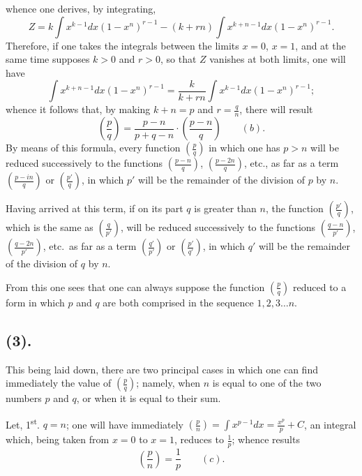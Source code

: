 \documentclass{article}
\begin{document}
whence one derives, by integrating,
\[ Z=k\int x^{k-1}dx(1-x^{n})^{r-1}-(k+rn)\int x^{k+n-1}dx(1-x^{n})^{r-1}. \]
Therefore, if one takes the integrals between the limits $x=0$, $x=1$, and at the same time supposes $k>0$ and $r>0$, so that $Z$ vanishes at both limits, one will have
\[ \int x^{k+n-1}dx(1-x^{n})^{r-1}=\frac{k}{k+rn}\int x^{k-1}dx(1-x^{n})^{r-1}; \]
whence it follows that, by making $k+n=p$ and $r=\frac{q}{n}$, there will result
\[ \left(\frac{p}{q}\right)=\frac{p-n}{p+q-n}\cdot\left(\frac{p-n}{q}\right)\qquad(b). \]
By means of this formula, every function $\left(\frac{p}{q}\right)$ in which one has $p>n$ will be reduced successively to the functions $\left(\frac{p-n}{q}\right)$, $\left(\frac{p-2n}{q}\right)$, etc., as far as a term $\left(\frac{p-in}{q}\right)$ or $\left(\frac{p'}{q}\right)$, in which $p'$ will be the remainder of the division of $p$ by $n$.

Having arrived at this term, if on its part $q$ is greater than $n$, the function $\left(\frac{p'}{q}\right)$, which is the same as $\left(\frac{q}{p'}\right)$, will be reduced successively to the functions $\left(\frac{q-n}{p'}\right)$, $\left(\frac{q-2n}{p'}\right)$, etc.\ as far as a term $\left(\frac{q'}{p'}\right)$ or $\left(\frac{p'}{q'}\right)$, in which $q'$ will be the remainder of the division of $q$ by $n$.

From this one sees that one can always suppose the function $\left(\frac{p}{q}\right)$ reduced to a form in which $p$ and $q$ are both comprised in the sequence $1, 2, 3\ldots n$.

\subsection*{(3).}

This being laid down, there are two principal cases in which one can find immediately the value of $\left(\frac{p}{q}\right)$; namely, when $n$ is equal to one of the two numbers $p$ and $q$, or when it is equal to their sum.

Let, 1\textsuperscript{st}. $q=n$; one will have immediately $\left(\frac{p}{n}\right)=\displaystyle\int x^{p-1}dx=\frac{x^{p}}{p}+C$, an integral which, being taken from $x=0$ to $x=1$, reduces to $\frac{1}{p}$; whence results
\[ \left(\frac{p}{n}\right)=\frac{1}{p}\qquad(c). \]

\end{document}
